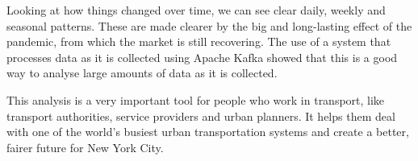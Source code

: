 \documentclass[conference]{IEEEtran}
\begin{document}
Looking at how things changed over time, we can see clear daily, weekly and seasonal patterns. These are made clearer by
the big and long-lasting effect of the pandemic, from which the market is still recovering. The use of a system that
processes data as it is collected using Apache Kafka showed that this is a good way to analyse large amounts of data as
it is collected.

This analysis is a very important tool for people who work in transport, like transport authorities, service providers
and urban planners. It helps them deal with one of the world's busiest urban transportation systems and create a better,
fairer future for New York City.




\end{document}
